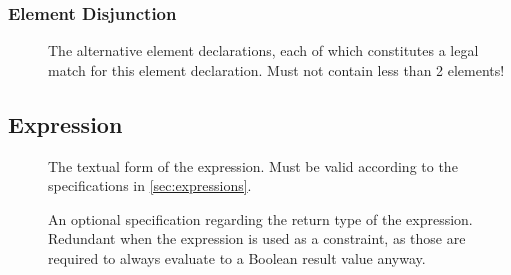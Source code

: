 \documentclass[11pt,a4paper]{article}
\begin{document}
\subsubsection{Element Disjunction}
\label{sec:json-ld-element-disjunction}
\begin{elements}{}
\end{elements}
\begin{description}
	\item[] The alternative element declarations, each of which constitutes a legal match for this element declaration. Must not contain less than 2 elements!
\end{description}

\subsection{Expression}
\label{sec:json-ld-expression}
\begin{attributes}{}
\end{attributes}
\begin{description}
	\item[] The textual form of the expression. Must be valid according to the specifications in \cref{sec:expressions}.
	\item[] An optional specification regarding the return type of the expression. Redundant when the expression is used as a constraint, as those are required to always evaluate to a Boolean result value anyway.
\end{description}
\end{document}
